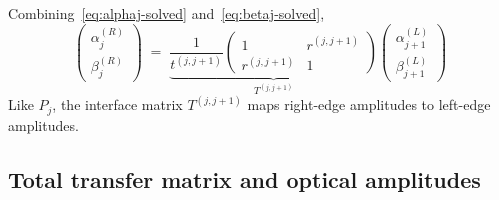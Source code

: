 \documentclass[aps,prb,onecolumn,superscriptaddress,nofootinbib,11pt]{revtex4-2}
\begin{document}
Combining~\eqref{eq:alphaj-solved} and~\eqref{eq:betaj-solved},
\begin{equation}
  \boxed{\;
    \begin{pmatrix} \alpha_j^{(R)} \\[2pt] \beta_j^{(R)}
    \end{pmatrix}
    \;=\;
    \underbrace{
      \frac{1}{t^{(j,j+1)}}
      \begin{pmatrix}
        1 & r^{(j,j+1)} \\[2pt]
        r^{(j,j+1)} & 1
      \end{pmatrix}
    }_{\displaystyle T^{(j,j+1)}}
    \begin{pmatrix}
      \alpha_{j+1}^{(L)} \\[2pt]
      \beta_{j+1}^{(L)}
    \end{pmatrix}
  \;}
  \label{eq:Tj-box}
\end{equation}
Like $P_j$, the interface matrix $T^{(j,j+1)}$ maps right-edge amplitudes to left-edge amplitudes.

\subsection{Total transfer matrix and optical amplitudes}
\label{sec:total-matrix}
\end{document}
